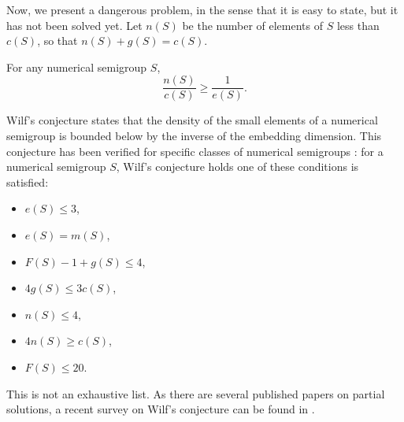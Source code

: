 Now, we present a dangerous problem, in the sense that it is easy to state, but it has not been solved yet. Let $n(S)$ be the number of elements of $S$ less than $c(S)$, so that $n(S) + g(S) = c(S)$.\par 

\begin{conjecture}[Wilf, 1978] \cite{wilf1978circle}\label{conj:smgps:wilf}
    For any numerical semigroup $S$,
    \[\frac{n(S)}{c(S)} \geq \frac{1}{e(S)}.\]
\end{conjecture}

Wilf's conjecture states that the density of the small elements of a numerical semigroup is bounded below by the inverse of the embedding dimension. This conjecture has been verified for specific classes of numerical semigroups \cite{assi2020numerical}: for a numerical semigroup $S$, Wilf's conjecture holds one of these conditions is satisfied:
\begin{itemize}
    \item $e(S) \leq 3$,
    \item $e(S) = m(S)$,
    \item $F(S) - 1 + g(S) \leq 4$,
    \item $4g(S) \leq 3c(S)$,
    \item $n(S) \leq 4$,
    \item $4n(S) \geq c(S)$,
    \item $F(S) \leq 20$.
\end{itemize}

This is not an exhaustive list. As there are several published papers on partial solutions, a recent survey on Wilf's conjecture can be found in \cite{2020conjecture}. \par